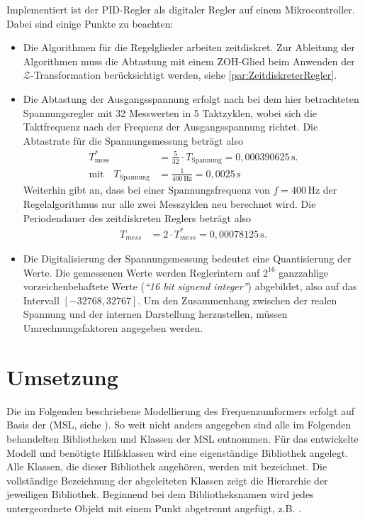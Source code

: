 Implementiert ist der PID-Regler als digitaler Regler auf einem Mikrocontroller. Dabei sind einige Punkte zu beachten:
\begin{itemize}
    \item {Die Algorithmen für die Regelglieder arbeiten zeitdiskret. Zur Ableitung der Algorithmen muss die Abtastung mit einem ZOH-Glied beim Anwenden der $\mathcal{Z}$-Transformation berücksichtigt werden, siehe \cref{par:ZeitdiskreterRegler}.}
    \item {Die Abtastung der Ausgangsspannung erfolgt nach \cite{DigitalerSpannungsreglerSoftwaredokumentation} bei dem hier betrachteten Spannungsregler mit 32 Messwerten in 5 Taktzyklen, wobei sich die Taktfrequenz nach der Frequenz der Ausgangsspannung richtet. Die Abtastrate für die Spannungsmessung beträgt also
    \begin{align}
        T_{\mathrm{mess}}^*&= \frac{5}{32}\cdot T_{\mathrm{Spannung}} = 0,000390625\,\mathrm s. \\
        \text{mit} \quad
        T_{\mathrm{Spannung}}&= \frac{1}{400\,\mathrm{Hz}}=0,0025\,\mathrm s
    \end{align}
    Weiterhin gibt \cite{DigitalerSpannungsreglerSoftwaredokumentation} an, dass bei einer Spannungsfrequenz von \(f=400\,\mathrm{Hz}\) der Regelalgorithmus nur alle zwei Messzyklen neu berechnet wird. Die Periodendauer des zeitdiskreten Reglers beträgt also
    \begin{align}
        T_{mess}&=2\cdot T_{mess}^*= 0,00078125\,\mathrm s.
    \end{align} }
    \item {Die Digitalisierung der Spannungsmessung bedeutet eine Quantisierung der Werte. Die gemessenen Werte werden Reglerintern auf \(2^{16}\) ganzzahlige vorzeichenbehaftete Werte (\emph{``16 bit signend integer''}) abgebildet, also auf das Intervall \([-32768,32767]\). Um den Zusammenhang zwischen der realen Spannung und der internen Darstellung herzustellen, müssen Umrechnungsfaktoren angegeben werden.}
\end{itemize}


\section{Umsetzung}\label{sec:umsetzung}

Die im Folgenden beschriebene Modellierung des Frequenzumformers erfolgt auf Basis der  (MSL, siehe \cite[]{modelicaassociationModelicaStandardLibrary2020}). So weit nicht anders angegeben sind alle im Folgenden behandelten Bibliotheken und Klassen der MSL entnommen. Für das entwickelte Modell und benötigte Hilfsklassen wird eine eigenständige Bibliothek  angelegt. Alle Klassen, die dieser Bibliothek angehören, werden mit  bezeichnet. Die vollständige Bezeichnung der abgeleiteten Klassen zeigt die Hierarchie der jeweiligen Bibliothek. Beginnend bei dem Bibliotheksnamen wird jedes untergeordnete Objekt mit einem Punkt abgetrennt angefügt, z.B. .

